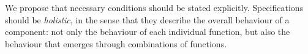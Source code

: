  We propose that  necessary conditions should be stated
 explicitly. Specifications should be \emph{holistic}, in the sense
 that they describe the  overall behaviour of a component: not only the
 behaviour of each individual function, but also  the
 behaviour that emerges through combinations of functions.
%
%
%
